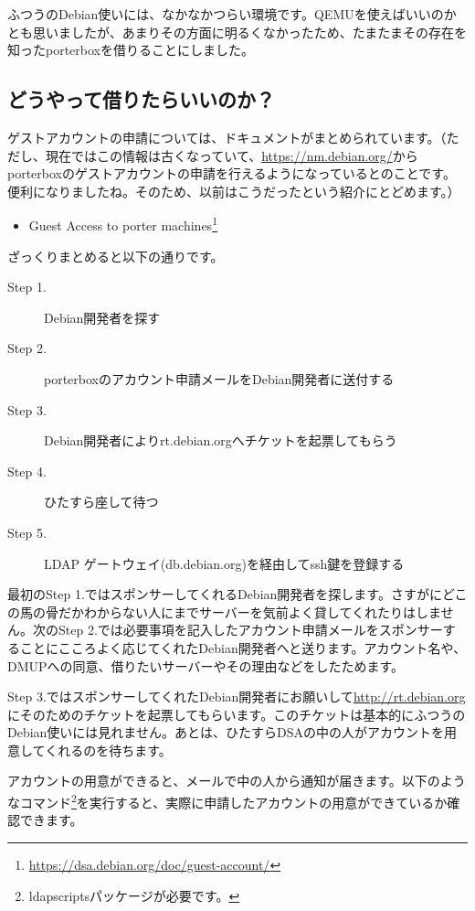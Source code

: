 \documentclass[mingoth,a4paper]{jsarticle}
\begin{document}
ふつうのDebian使いには、なかなかつらい環境です。QEMUを使えばいいのかとも思いましたが、あまりその方面に明るくなかったため、たまたまその存在を知ったporterboxを借りることにしました。

\subsection{どうやって借りたらいいのか？}

ゲストアカウントの申請については、ドキュメントがまとめられています。（ただし、現在ではこの情報は古くなっていて、\url{https://nm.debian.org/}からporterboxのゲストアカウントの申請を行えるようになっているとのことです。便利になりましたね。そのため、以前はこうだったという紹介にとどめます。）

\begin{itemize}
\item Guest Access to porter machines\footnote{\url{https://dsa.debian.org/doc/guest-account/}}
\end{itemize}

ざっくりまとめると以下の通りです。

\begin{description}
\item [Step 1.] Debian開発者を探す
\item [Step 2.] porterboxのアカウント申請メールをDebian開発者に送付する
\item [Step 3.] Debian開発者によりrt.debian.orgへチケットを起票してもらう
\item [Step 4.] ひたすら座して待つ
\item [Step 5.] LDAP ゲートウェイ(db.debian.org)を経由してssh鍵を登録する
\end{description}

最初のStep 1.ではスポンサーしてくれるDebian開発者を探します。さすがにどこの馬の骨だかわからない人にまでサーバーを気前よく貸してくれたりはしません。次のStep 2.では必要事項を記入したアカウント申請メールをスポンサーすることにこころよく応じてくれたDebian開発者へと送ります。アカウント名や、DMUPへの同意、借りたいサーバーやその理由などをしたためます。

Step 3.ではスポンサーしてくれたDebian開発者にお願いして\url{http://rt.debian.org}にそのためのチケットを起票してもらいます。このチケットは基本的にふつうのDebian使いには見れません。あとは、ひたすらDSAの中の人がアカウントを用意してくれるのを待ちます。

アカウントの用意ができると、メールで中の人から通知が届きます。以下のようなコマンド\footnote{ldapscriptsパッケージが必要です。}を実行すると、実際に申請したアカウントの用意ができているか確認できます。
\end{document}
